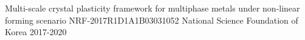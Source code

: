 \begin{cvhonors}

  \cvhonor
  {Multi-scale crystal plasticity framework for multiphase metals under non-linear forming scenario} %
  {NRF-2017R1D1A1B03031052}%
  {National Science Foundation of Korea} %
  {2017-2020} %

\end{cvhonors}